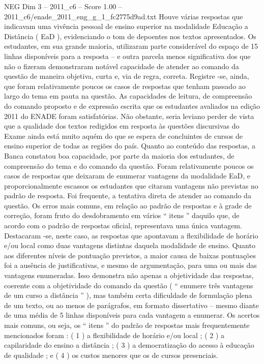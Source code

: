 \begin{textsample}{NEG Dim 3 – 2011\_c6 – Score 1.00 – 2011\_c6/enade\_2011\_eng\_g\_1\_fc2775d9ad.txt}
Houve várias respostas que indicavam uma vivência pessoal de ensino superior na modalidade Educação a Distância ( EaD ), evidenciando o tom de depoentes nos textos apresentados.
Os estudantes, em sua grande maioria, utilizaram parte considerável do espaço de 15 linhas disponíveis para a resposta – e outra parcela menos significativa dos que não o fizeram demonstraram notável capacidade de atender ao comando da questão de maneira objetiva, curta e, via de regra, correta.
Registre -se, ainda, que foram relativamente poucos os casos de respostas que tenham passado ao largo do tema em pauta na questão.
As capacidades de leitura, de compreensão do comando proposto e de expressão escrita que os estudantes avaliados na edição 2011 do ENADE foram satisfatórias.
Não obstante, seria leviano perder de vista que a qualidade dos textos redigidos em resposta às questões discursivas do Exame ainda está muito aquém do que se espera de concluintes de cursos de ensino superior de todas as regiões do país.
Quanto ao conteúdo das respostas, a Banca constatou boa capacidade, por parte da maioria dos estudantes, de compreensão do tema e do comando da questão.
Foram relativamente poucos os casos de respostas que deixaram de enumerar vantagens da modalidade EaD, e proporcionalmente escassos os estudantes que citaram vantagens não previstas no padrão de resposta.
Foi frequente, a tentativa direta de atender ao comando da questão.
Os erros mais comuns, em relação ao padrão de respostas e à grade de correção, foram fruto do desdobramento em vários “ itens ” daquilo que, de acordo com o padrão de respostas oficial, representava uma única vantagem.
Destacaram -se, neste caso, as respostas que apontavam a flexibilidade de horário e/ou local como duas vantagens distintas daquela modalidade de ensino.
Quanto aos diferentes níveis de pontuação previstos, a maior causa de baixas pontuações foi a ausência de justificativas, e mesmo de argumentação, para uma ou mais das vantagens enumeradas.
Isso demonstra não apenas a objetividade das respostas, coerente com a objetividade do comando da questão ( “ enumere três vantagens de um curso a distância ” ), mas também certa dificuldade de formulação plena de um texto, ou ao menos de parágrafos, em formato dissertativo – mesmo diante de uma média de 5 linhas disponíveis para cada vantagem a enumerar.
Os acertos mais comuns, ou seja, os “ itens ” do padrão de respostas mais frequentemente mencionados foram : ( 1 ) a flexibilidade de horário e/ou local ; ( 2 ) a capilaridade do ensino a distância ; ( 3 ) a democratização do acesso à educação de qualidade ; e ( 4 ) os custos menores que os de cursos presenciais.

\end{textsample}
